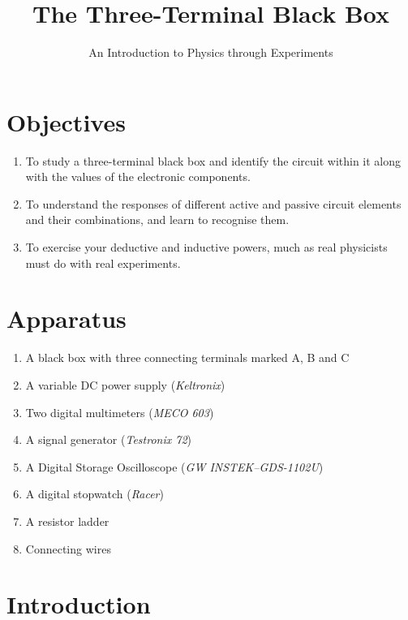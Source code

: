 \title{The Three-Terminal Black Box}
\author{An Introduction to Physics through Experiments}
\date{}

\maketitle

\section*{Objectives}

\begin{enumerate}
\item To study a three-terminal black box and identify the circuit within it along with the values of the electronic components.

\item To understand the responses of different active and passive circuit elements and their combinations, and learn to recognise them.

\item To exercise your deductive and inductive powers, much as real physicists must do with real experiments.

\end{enumerate}




\section*{Apparatus}

\begin{enumerate}
\item A black box with three connecting terminals marked A, B and C
\item A variable DC power supply (\textit{Keltronix})
\item Two digital multimeters (\textit{MECO 603})
\item A signal generator (\textit{Testronix 72})
\item A Digital Storage Oscilloscope (\textit{GW INSTEK–GDS-1102U})
\item A digital stopwatch (\textit{Racer})
\item A resistor ladder
\item Connecting wires

\end{enumerate}


\section*{Introduction}


